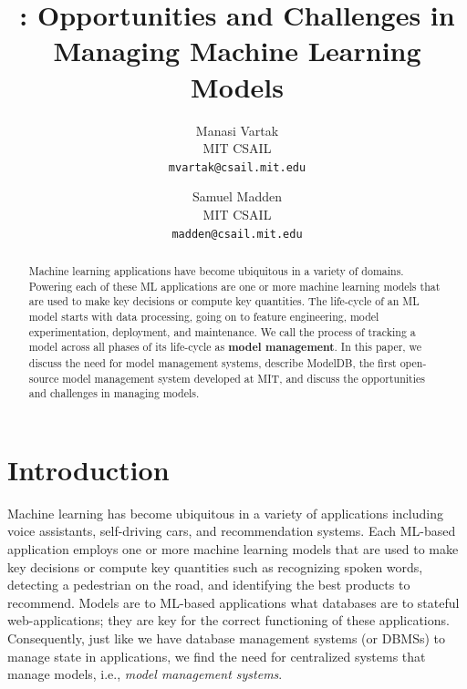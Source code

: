 \documentclass[11pt]{article}
\title{\mdb: Opportunities and Challenges in Managing Machine Learning Models}
\author{
  Manasi Vartak\\
  MIT CSAIL \\
  \texttt{mvartak@csail.mit.edu}
  \and
  Samuel Madden\\
  MIT CSAIL \\
  \texttt{madden@csail.mit.edu}
}
\newcommand{\mdb}{{\sc ModelDB}\xspace}
\begin{document}
\maketitle
\begin{abstract}
Machine learning applications have become ubiquitous in a variety of domains.
Powering each of these ML applications are one or more machine learning models that are used to make key decisions or compute key quantities.
The life-cycle of an ML model starts with data processing, going on to feature engineering, model experimentation, deployment, and maintenance.
We call the process of tracking a model across all phases of its life-cycle as {\bf model management}.
In this paper, we discuss the need for model management systems, describe \mdb, the first open-source model management system developed at MIT, and discuss the opportunities and challenges in managing models. 
\end{abstract}

\section{Introduction}
\label{sec:model-management}

Machine learning has become ubiquitous in a variety of applications including voice assistants, self-driving cars, and recommendation systems.
Each ML-based application employs one or more machine learning models that are used to make key decisions or compute key quantities such as recognizing spoken words, detecting a pedestrian on the road, and identifying the best products to recommend.
Models are to ML-based applications what databases are to stateful web-applications; they are key for the correct functioning of these applications.
Consequently, just like we have database management systems (or DBMSs) to manage state in applications, we find the need for centralized systems that manage models, i.e., {\it model management systems}.

\end{document}
